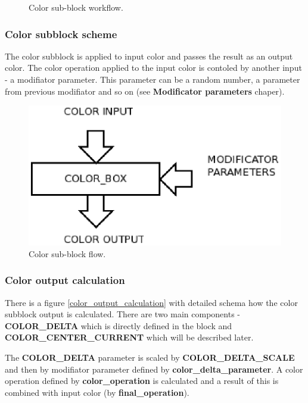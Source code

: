 \documentclass[9pt]{article}
\begin{document}
\begin{figure}[h]
\begin{center}
  \caption{Color sub-block workflow.}
  \label{color_sub_block_workflow}
\end{center}
\end{figure}

\subsubsection*{Color subblock scheme}

The color subblock is applied to input color
and passes the result as an output color. The color operation 
applied to the input color is contoled by another input - 
a modifiator parameter. This parameter can be a random number, a parameter
from previous modifiator and so on (see {\bf Modificator parameters} chaper).

\begin{figure}[h]
\begin{center}
  \includegraphics[scale=0.6]{p07.eps}
  \caption{Color sub-block flow.}
  \label{color_sub_block_flow}
\end{center}
\end{figure}

\subsubsection*{Color output calculation}

There is a figure \ref{color_output_calculation} with detailed schema 
how the color subblock output is calculated. There are two main components - 
{\bf COLOR\_DELTA} which is directly defined in the block and 
{\bf COLOR\_CENTER\_CURRENT} which will be described later.

The {\bf COLOR\_DELTA} parameter is scaled by {\bf COLOR\_DELTA\_SCALE} 
and then by modifiator parameter defined by {\bf color\_delta\_parameter}. 
A color operation defined by {\bf color\_operation} is calculated 
and a result of this is combined with input color (by {\bf final\_operation}).
\end{document}
